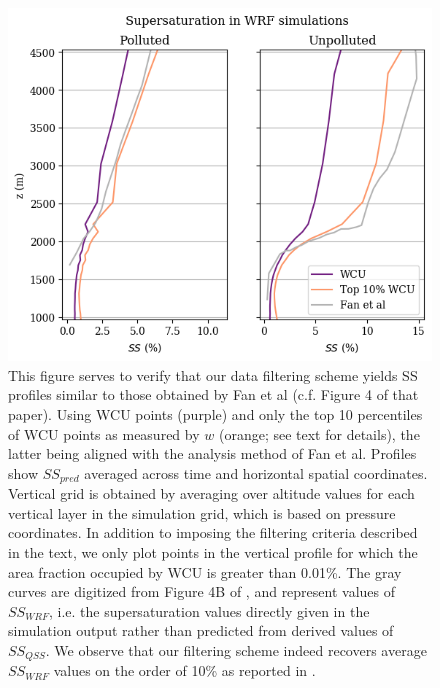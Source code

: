 \documentclass{article}
\begin{document}
\begin{figure}[ht]
	\centering
	\includegraphics[width=\textwidth]{wrf/ss_pred_vs_z_figure.png}
	\caption{This figure serves to verify that our data filtering scheme yields SS profiles similar to those obtained by Fan et al (c.f. Figure 4 of that paper). Using WCU points (purple) and only the top 10 percentiles of WCU points as measured by $w$ (orange; see text for details), the latter being aligned with the analysis method of Fan et al. Profiles show $SS_{pred}$ averaged across time and horizontal spatial coordinates. Vertical grid is obtained by averaging over altitude values for each vertical layer in the simulation grid, which is based on pressure coordinates. In addition to imposing the filtering criteria described in the text, we only plot points in the vertical profile for which the area fraction occupied by WCU is greater than 0.01\%. The gray curves are digitized from Figure 4B of \cite{Fan2018}, and represent values of $SS_{WRF}$, i.e. the supersaturation values directly given in the simulation output rather than predicted from derived values of $SS_{QSS}$. We observe that our filtering scheme indeed recovers average $SS_{WRF}$ values on the order of 10\% as reported in \cite{Fan2018}.}
	\label{wrfssvertprof}
\end{figure}

\clearpage
\newpage
\end{document}
